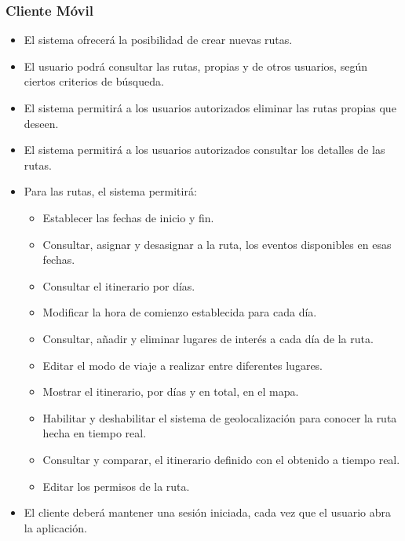 \subsubsection*{Cliente Móvil}
\begin{itemize}
\setlength\itemsep{1pt}
\item El sistema ofrecerá la posibilidad de crear nuevas rutas.
\item El usuario podrá consultar las rutas, propias y de otros usuarios, según ciertos criterios de búsqueda.
\item El sistema permitirá a los usuarios autorizados eliminar las rutas propias que deseen.
\item El sistema permitirá a los usuarios autorizados consultar los detalles de las rutas.
\item Para las rutas, el sistema permitirá:
	\begin{itemize}
	\item Establecer las fechas de inicio y fin.
	\item Consultar, asignar y desasignar a la ruta, los eventos disponibles en esas fechas.
	\item Consultar el itinerario por días.
	\item Modificar la hora de comienzo establecida para cada día.
	\item Consultar, añadir y eliminar lugares de interés a cada día de la ruta.
	\item Editar el modo de viaje a realizar entre diferentes lugares.
	\item Mostrar el itinerario, por días y en total, en el mapa.
	\item Habilitar y deshabilitar el sistema de geolocalización para conocer la ruta hecha en tiempo real.
	\item Consultar y comparar, el itinerario definido con el obtenido a tiempo real.
	\item Editar los permisos de la ruta.
	\end{itemize}
\item El cliente deberá mantener una sesión iniciada, cada vez que el usuario abra la aplicación.
\end{itemize}

